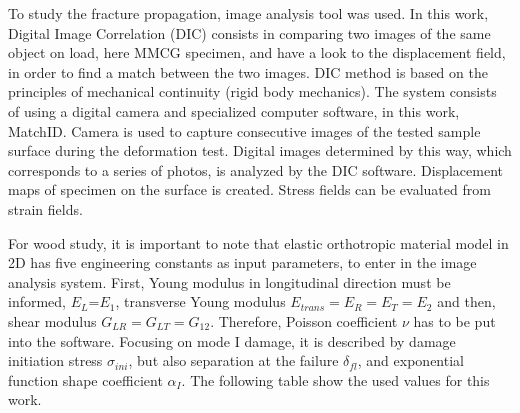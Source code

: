 \documentclass[3p,times,procedia]{elsarticle}
\begin{document}
To study the fracture propagation, image analysis tool was used.
In this work, Digital Image Correlation (DIC) consists in comparing two images of the same object on load, here MMCG specimen, and have a look to the displacement field, in order to find a match between the two images.
DIC method is based on the principles of mechanical continuity (rigid body mechanics). The system consists of using a digital camera and specialized computer software, in this work, MatchID. Camera is used to capture consecutive images of the tested sample surface during the deformation test. Digital images determined by this way, which corresponds to a series of photos, is analyzed by the DIC software. Displacement maps of specimen on the surface is created. Stress fields can be evaluated from strain fields. 

For wood study, it is important to note that elastic orthotropic material model in 2D has five engineering constants as input parameters, to enter in the image analysis system. First, Young modulus in longitudinal direction must be informed, $E_{L}$=$E_{1}$, transverse Young modulus $E_{trans}=E_{R}=E_{T}=E_{2}$ and then, shear modulus $G_{LR}=G_{LT}=G_{12}$. Therefore, Poisson coefficient $\nu$ has to be put into the software. Focusing on mode I damage, it is described by damage initiation stress $\sigma_{ini}$, but also separation at the failure $\delta_{fl}$, and exponential function shape coefficient $\alpha_{I}$. The following table show the used values for this work.

\end{document}
